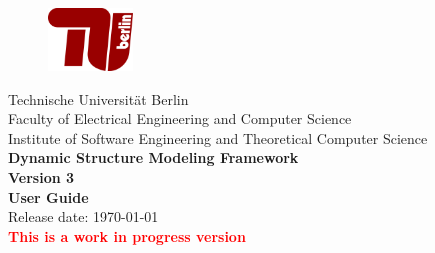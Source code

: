 \begin{figure}[t]
	\centering
	\includegraphics[width=0.2\textwidth]{images/TUB-logo}
	\vspace{1cm}
\end{figure}

\begin{center}
	\huge{Technische Universität Berlin}
	\\[1cm]
	
	\LARGE{Faculty of Electrical Engineering and Computer Science}
	\\[0.3cm]
	\LARGE{Institute of Software Engineering and Theoretical Computer Science}
	\\[2cm]
	
	\textbf{\Huge{Dynamic Structure Modeling Framework \\[1cm] Version 3}}
	\\[2cm]
	
	\textbf{\Huge{User Guide}}
	\\[3cm]
	
	Release date: \today
	\\
	\Huge{\textbf{\textcolor{red}{This is a work in progress version}}}
\end{center}